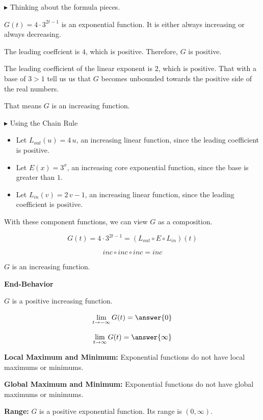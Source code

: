 \documentclass{ximera}
\begin{document}
\begin{example}
$\blacktriangleright$ Thinking about the formula pieces.

$G(t) = 4 \cdot 3^{2t-1}$ is an exponential function.  It  is either always increasing or always decreasing.


The leading coeffcient is $4$, which is positive.  Therefore, $G$ is positive.

The leading coefficient of the linear exponent is $2$, which is positive.  That with a base of $3 > 1$ tell us us that $G$ becomes unbounded towards the positive side of the real numbers.


That means $G$ is an increasing function.



$\blacktriangleright$ Using the Chain Rule


\begin{itemize}
\item Let $L_{out}(u) = 4 \, u$, an increasing linear function, since the leading coefficient is positive.
\item Let $E(x) = 3^x$, an increasing core exponential function, since the base is greater than $1$.
\item Let $L_{in}(v) = 2 \, v - 1$, an increasing linear function, since the leading coefficient is positive.
\end{itemize}

With these component functions, we can view $G$ as a composition.


\[  G(t) = 4 \cdot 3^{2t-1} = (L_{out} \circ E \circ L_{in})(t) \]

\[ inc \circ inc \circ inc = inc  \]


$G$ is an increasing function.



\textbf{End-Behavior}


$G$ is a positive increasing function.



\[
\lim\limits_{t \to -\infty}G(t) = \answer{0}  
\]

\[
\lim\limits_{t \to \infty}G(t) = \answer{\infty}
\]





\textbf{Local Maximum and Minimum:}  Exponential functions do not have local maximums or minimums.






\textbf{Global Maximum and Minimum:}  Exponential functions do not have global maximums or minimums.




\textbf{Range:}  $G$ is a positive exponential function.   Its range is $(0, \infty)$.



\end{example}
\end{document}
